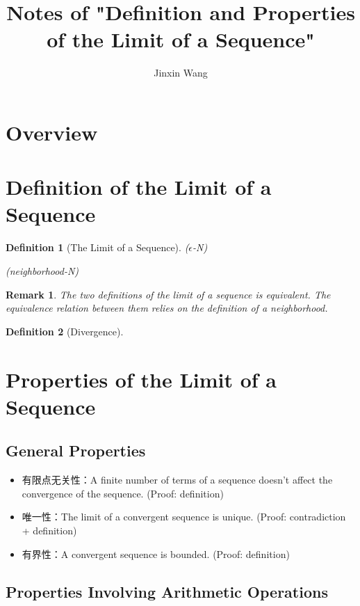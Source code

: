 \documentclass[onecolumn]{ctexart}
\title{Notes of "Definition and Properties of the Limit of a Sequence"}
\author{Jinxin Wang}
\date{}
\newtheorem{definition}{Definition}
\newtheorem{remark}{Remark}
\begin{document}
\maketitle

\section{Overview}

\section{Definition of the Limit of a Sequence}

\begin{definition}[The Limit of a Sequence]
  ($\epsilon$-N) 

  (neighborhood-N)
\end{definition}

\begin{remark}
  The two definitions of the limit of a sequence is equivalent. The equivalence 
  relation between them relies on the definition of a neighborhood.
\end{remark}

\begin{definition}[Divergence]
  
\end{definition}

\section{Properties of the Limit of a Sequence}

\subsection{General Properties}

\begin{itemize}
  \item 有限点无关性：A finite number of terms of a sequence doesn't affect the 
  convergence of the sequence. (Proof: definition)
  \item 唯一性：The limit of a convergent sequence is unique. (Proof: 
  contradiction + definition)
  \item 有界性：A convergent sequence is bounded. (Proof: definition)
\end{itemize}

\subsection{Properties Involving Arithmetic Operations}
\end{document}
